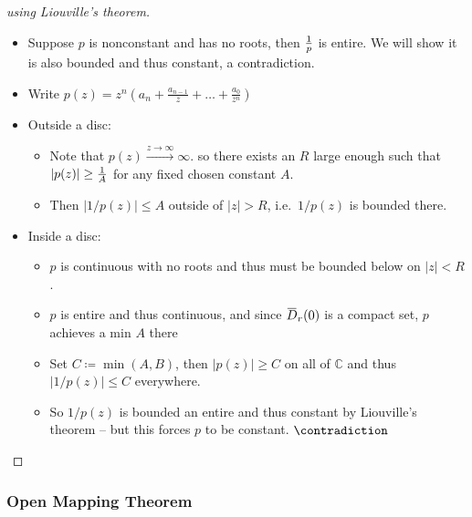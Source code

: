 \begin{proof}[using Liouville's theorem]

\envlist

\begin{itemize}
\tightlist
\item
  Suppose \(p\) is nonconstant and has no roots, then \({1\over p}\) is
  entire. We will show it is also bounded and thus constant, a
  contradiction.
\item
  Write
  \(p(z) = z^n \left(a_n + \frac{a_{n-1}}{z}+\dots+\frac{a_{0}}{z^{n}}\right)\)
\item
  Outside a disc:

  \begin{itemize}
  \tightlist
  \item
    Note that \(p(z) \overset{z\to \infty }\to \infty\). so there exists
    an \(R\) large enough such that
    \({\left\lvert {p(z)} \right\rvert} \geq {1\over A}\) for any fixed
    chosen constant \(A\).
  \item
    Then \({\left\lvert { 1/p(z)} \right\rvert} \leq A\) outside of
    \({\left\lvert {z} \right\rvert} >R\), i.e.~\(1/p(z)\) is bounded
    there.
  \end{itemize}
\item
  Inside a disc:

  \begin{itemize}
  \tightlist
  \item
    \(p\) is continuous with no roots and thus must be bounded below on
    \({\left\lvert {z} \right\rvert} < R\).
  \item
    \(p\) is entire and thus continuous, and since
    \(\mkern 1.5mu\overline{\mkern-1.5muD\mkern-1.5mu}\mkern 1.5mu_r(0)\)
    is a compact set, \(p\) achieves a min \(A\) there
  \item
    Set \(C \coloneqq\min(A, B)\), then
    \({\left\lvert {p(z)} \right\rvert} \geq C\) on all of
    \({\mathbb{C}}\) and thus
    \({\left\lvert {1/p(z)} \right\rvert} \leq C\) everywhere.
  \item
    So \(1/p(z)\) is bounded an entire and thus constant by Liouville's
    theorem -- but this forces \(p\) to be constant. \(\contradiction\)
  \end{itemize}
\end{itemize}

\end{proof}

\hypertarget{open-mapping-theorem}{%
\subsubsection{Open Mapping Theorem}\label{open-mapping-theorem}}

